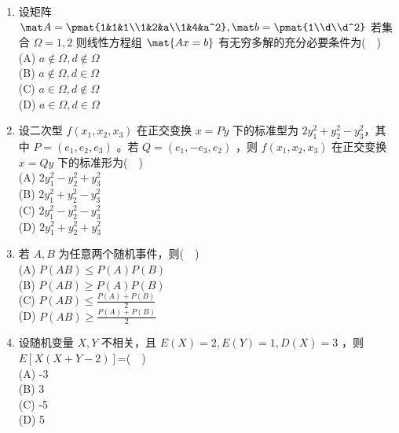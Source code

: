 \begin{enumerate}
\item 设矩阵 $\mat A=\pmat{1&1&1\\1&2&a\\1&4&a^2},\mat b=\pmat{1\\d\\d^2}$  若集合 $\Omega={1,2}$ 则线性方程组 $\mat{ Ax=b}$  有无穷多解的充分必要条件为($\quad$)\\
(A) $a\notin \Omega,d\notin \Omega$ \\
(B) $a\notin \Omega,d\in \Omega$\\
(C) $a\in \Omega,d\notin \Omega$\\
(D) $a\in \Omega,d\in \Omega$\\
\item 设二次型 $f(x_1,x_2,x_3)$ 在正交变换  $x=Py$ 下的标准型为 $2y_1^2+y_2^2-y_3^2$，其中 $P=(e_1,e_2,e_3)$ 。若 $Q=(e_1,-e_3,e_2)$ ，则 $f(x_1,x_2,x_3)$  在正交变换 $x=Qy$  下的标准形为($\quad$)\\
(A) $2y_1^2-y_2^2+y_3^2$\\
(B) $2y_1^2+y_2^2-y_3^2$\\
(C) $2y_1^2-y_2^2-y_3^2$\\
(D) $2y_1^2+y_2^2+y_3^2$
\item 若 $A,B$ 为任意两个随机事件，则($\quad$)\\
(A) $P(AB)\le P(A)P(B)$\\
(B) $P(AB) \ge P(A)P(B)$\\
(C) $\displaystyle P(AB)\le \frac{P(A)+P(B)}{2}$\\
(D) $\displaystyle P(AB)\ge \frac{P(A)+P(B)}{2}$
\item  设随机变量 $X,Y$ 不相关，且 $E(X)=2,E(Y)=1,D(X)=3$  ，则 $E[X(X+Y-2)]$=($\quad$)\\
(A) -3\\
(B) 3\\
(C) -5\\
(D) 5
\end{enumerate}
